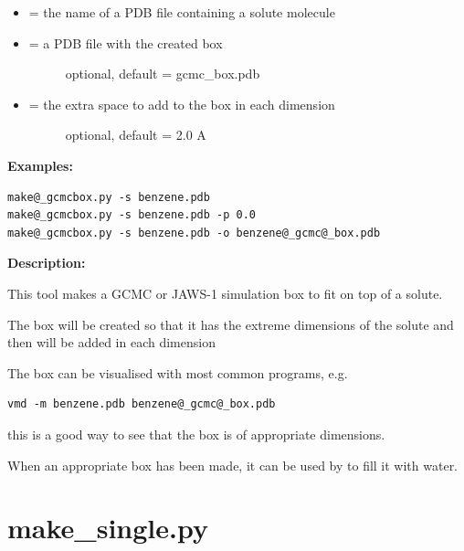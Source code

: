 \documentclass[letterpaper,10pt,english]{manual}
\begin{document}
\begin{itemize}
\item {} 
 = the name of a PDB file containing a solute molecule

\item {} \begin{description}
\item[{ = a PDB file with the created box}] \leavevmode
optional, default = gcmc\_box.pdb

\end{description}

\item {} \begin{description}
\item[{ = the extra space to add to the box in each dimension}] \leavevmode
optional, default = 2.0 A

\end{description}

\end{itemize}

\textbf{Examples:}

\begin{Verbatim}[commandchars=@\[\]]
make@_gcmcbox.py -s benzene.pdb
make@_gcmcbox.py -s benzene.pdb -p 0.0
make@_gcmcbox.py -s benzene.pdb -o benzene@_gcmc@_box.pdb
\end{Verbatim}

\textbf{Description:}

This tool makes a GCMC or JAWS-1 simulation box to fit on top of a solute.

The box will be created so that it has the extreme dimensions of the solute and then  will be added in each dimension

The box can be visualised with most common programs, e.g.

\begin{Verbatim}[commandchars=@\[\]]
vmd -m benzene.pdb benzene@_gcmc@_box.pdb
\end{Verbatim}

this is a good way to see that the box is of appropriate dimensions.

When an appropriate box has been made, it can be used by  to fill it with water.


\section{make\_single.py}
\end{document}
